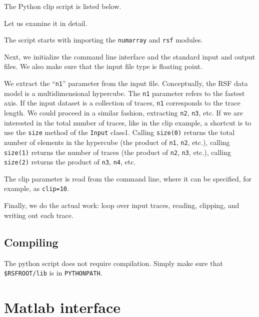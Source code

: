 The Python clip script is listed below.


Let us examine it in detail. 


The script starts with importing the \texttt{numarray} and
\texttt{rsf} modules.


Next, we initialize the command line interface and the standard input and
output files. We also make sure that the input file type is floating point.


We extract the ``\texttt{n1}'' parameter from the input file.
Conceptually, the RSF data model is a multidimensional hypercube.  The
\texttt{n1} parameter refers to the fastest axis. If the input dataset
is a collection of traces, \texttt{n1} corresponds to the trace
length. We could proceed in a similar fashion, extracting \texttt{n2},
\texttt{n3}, etc. If we are interested in the total number of traces,
like in the clip example, a shortcut is to use the \texttt{size}
method of the \texttt{Input} class1.  Calling \texttt{size(0)} returns
the total number of elements in the hypercube (the product of
\texttt{n1}, \texttt{n2}, etc.), calling \texttt{size(1)} returns the
number of traces (the product of \texttt{n2}, \texttt{n3}, etc.),
calling \texttt{size(2)} returns the product of \texttt{n3},
\texttt{n4}, etc.


The clip parameter is read from the command line, where it can be specified,
for example, as \texttt{clip=10}.


Finally, we do the actual work: loop over input traces, reading,
clipping, and writing out each trace.

\subsection{Compiling}

The python script does not require compilation. Simply make sure that
\texttt{\$RSFROOT/lib} is in \texttt{PYTHONPATH}. 

\section{Matlab interface}

